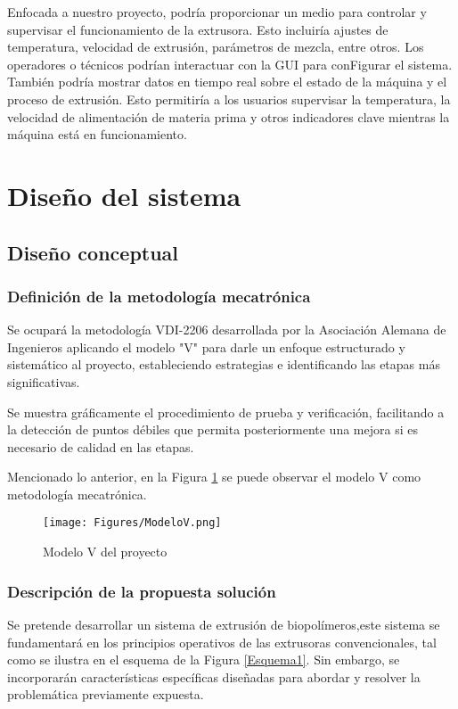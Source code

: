 \documentclass[14pt,oneside]{extarticle} %
\begin{document}
Enfocada a nuestro proyecto, podría proporcionar un medio para controlar y supervisar el funcionamiento de la extrusora. Esto incluiría ajustes de temperatura, velocidad de extrusión, parámetros de mezcla, entre otros. Los operadores o técnicos podrían interactuar con la GUI para conFigurar el sistema. También podría mostrar datos en tiempo real sobre el estado de la máquina y el proceso de extrusión. Esto permitiría a los usuarios supervisar la temperatura, la velocidad de alimentación de materia prima y otros indicadores clave mientras la máquina está en funcionamiento. 

\newpage

\section{Diseño del sistema}

\subsection{Diseño conceptual}

\subsubsection{Definición de la metodología mecatrónica}
Se ocupará la metodología VDI-2206 desarrollada por la Asociación Alemana de Ingenieros \cite{VDI2206} aplicando el modelo "V" para darle un enfoque estructurado y sistemático al proyecto, estableciendo estrategias e identificando las etapas más significativas. 

Se muestra gráficamente el procedimiento de prueba y verificación, facilitando a la detección de puntos débiles que permita posteriormente una mejora si es necesario de calidad en las etapas.

Mencionado lo anterior, en la Figura \ref{fig:modeloV} se puede observar el modelo V como metodología mecatrónica.

\begin{figure}[H]
    \centering
    \texttt{[image: Figures/ModeloV.png]}
    \caption{Modelo V del proyecto}
    \label{fig:modeloV}
\end{figure}

\subsubsection{Descripción de la propuesta solución}

Se pretende desarrollar un sistema de extrusión de biopolímeros,este sistema se fundamentará en los principios operativos de las extrusoras convencionales, tal como se ilustra en el esquema de la Figura \ref{Esquema1}. Sin embargo, se incorporarán características específicas diseñadas para abordar y resolver la problemática previamente expuesta.
\end{document}

